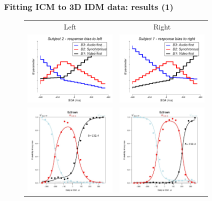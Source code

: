 \documentclass[xcolor={fixpdftex,hyperref,x11names},10pt,pdftex,hyperref={pdftex}]{beamer}
\begin{document}
\begin{frame}
  \frametitle{Fitting ICM to 3D IDM data: results (1)}
   \begin{figure}[h]
      \begin{tabular}{c c}
      Left & Right\\
      \includegraphics[width=45mm,totalheight=0.4\textheight]{figs/sub2_plot_Bs}
      &
      \includegraphics[width=45mm,totalheight=0.4\textheight]{figs/sub1_plot_Bs}\\
        
      \includegraphics[width=45mm,totalheight=0.4\textheight]{figs/sub2_fitted_model.jpg}
      &
      \includegraphics[width=45mm,totalheight=0.4\textheight]{figs/sub1_fitted_model.jpg}
       \end{tabular}
   \end{figure}
\end{frame}  
\end{document}
